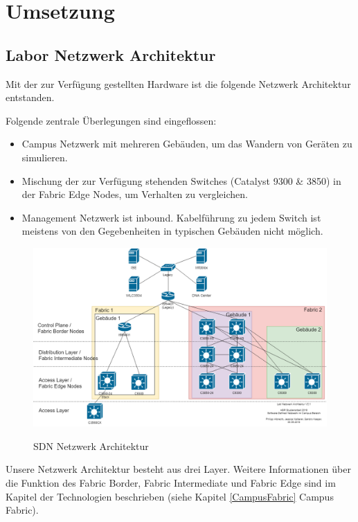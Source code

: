 \section{Umsetzung}

\subsection{Labor Netzwerk Architektur} \label{subsec:Labor-Netzwerk-Architektur}
Mit der zur Verfügung gestellten Hardware ist die folgende Netzwerk Architektur entstanden.

Folgende zentrale Überlegungen sind eingeflossen:

\begin{itemize}
	\item Campus Netzwerk mit mehreren Gebäuden, um das Wandern von Geräten zu simulieren.
	\item Mischung der zur Verfügung stehenden Switches (Catalyst 9300 \& 3850) in der Fabric Edge Nodes, um Verhalten zu vergleichen.
	\item Management Netzwerk ist inbound. Kabelführung zu jedem Switch ist meistens von den Gegebenheiten in typischen Gebäuden nicht möglich.
\end{itemize}


\begin{figure}[H]
	\centering
	\includegraphics[width=1\linewidth]{img/LabNetworkArchitecture.png}\\[1px]
	\caption{SDN Netzwerk Architektur}
	\label{fig:LabNetworkArchitecture}
\end{figure}

Unsere Netzwerk Architektur besteht aus drei Layer. Weitere Informationen über die Funktion des Fabric Border, Fabric Intermediate und Fabric Edge sind im Kapitel der Technologien beschrieben (siehe Kapitel \ref{CampusFabric} Campus Fabric).

